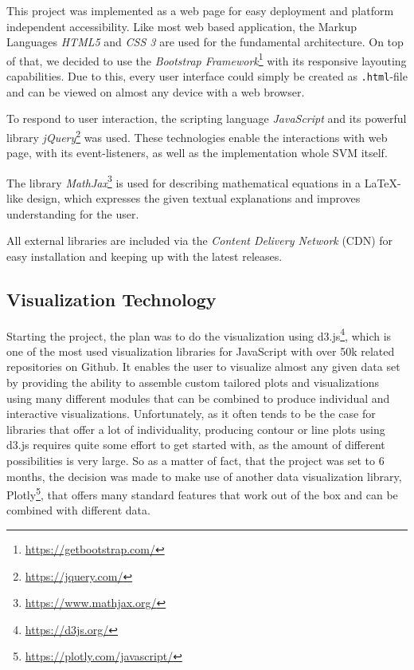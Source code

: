 \documentclass[parskip=half]{scrartcl}
\begin{document}
This project was implemented as a web page for easy deployment and platform independent accessibility.
Like most web based application, the Markup Languages \textit{HTML5} and \textit{CSS 3} are used for the fundamental architecture.
On top of that, we decided to use the \textit{Bootstrap Framework}\footnote{\url{https://getbootstrap.com/}} with its responsive layouting capabilities.
Due to this, every user interface could simply be created as \verb|.html|-file and can be viewed on almost any device with a web browser.

To respond to user interaction, the scripting language \textit{JavaScript} and its powerful library \textit{jQuery}\footnote{\url{https://jquery.com/}} was used.
These technologies enable the interactions with web page, with its event-listeners, as well as the implementation whole SVM itself.

The library \textit{MathJax}\footnote{\url{https://www.mathjax.org/}} is used for describing mathematical equations in a \LaTeX-like design, which expresses the given textual explanations and improves understanding for the user.

All external libraries are included via the \textit{Content Delivery Network} (CDN) for easy installation and keeping up with the latest releases.

\subsection{Visualization Technology}

Starting the project, the plan was to do the visualization using d3.js\footnote{\url{https://d3js.org/}}, which is one of the most used visualization libraries for JavaScript with over 50k related repositories on Github.
It enables the user to visualize almost any given data set by providing the ability to assemble custom tailored plots and visualizations using many different modules that can be combined to produce individual and interactive visualizations.
Unfortunately, as it often tends to be the case for libraries that offer a lot of individuality, producing contour or line plots using d3.js requires quite some effort to get started with, as the amount of different possibilities is very large. 
So as a matter of fact, that the project was set to 6 months, the decision was made to make use of another data visualization library, Plotly\footnote{\url{https://plotly.com/javascript/}}, that offers many standard features that work out of the box and can be combined with different data.
\end{document}
